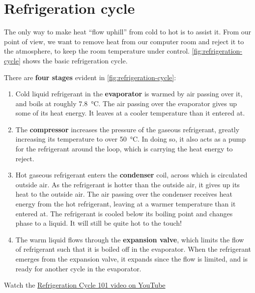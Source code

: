 \documentclass{pgnotes}
\begin{document}
\section{Refrigeration cycle}

The only way to make heat ``flow uphill'' from cold to hot is to assist it.
From our point of view, we want to remove heat from our computer room and reject it to the atmosphere, to keep the room temperature under control.
\autoref{fig:refrigeration-cycle} shows the basic refrigeration cycle.


There are \textbf{four stages} evident in \autoref{fig:refrigeration-cycle}:
\begin{enumerate}
\item Cold liquid refrigerant in the \textbf{evaporator} is warmed by air passing over it, and boils at roughly \SI{7.8}{\degreeCelsius}. The air passing over the evaporator gives up some of its heat energy. It leaves at a cooler temperature than it entered at.
\item The \textbf{compressor} increases the pressure of the gaseous refrigerant, greatly increasing its temperature to over \SI{50}{\degreeCelsius}.  In doing so, it also acts as a pump for the refrigerant around the loop, which is carrying the heat energy to reject.
\item Hot gaseous refrigerant enters the \textbf{condenser} coil, across which is circulated outside air. As the refrigerant is hotter than the outside air, it gives up its heat to the outside air.  The air passing over the condenser receives heat energy from the hot refrigerant, leaving at a warmer temperature than it entered at. The refrigerant is cooled below its boiling point and changes phase to a liquid.  It will still be quite hot to the touch!
\item The warm liquid flows through the \textbf{expansion valve}, which limits the flow of refrigerant such that it is boiled off in the evaporator. When the refrigerant emerges from the expansion valve, it expands since the flow is limited, and is ready for another cycle in the evaporator. 
\end{enumerate}

Watch the \href{https://www.youtube.com/watch?v=VJX0LyxRV0E}{Refrigeration Cycle 101 video on YouTube}

\newpage
\end{document}
